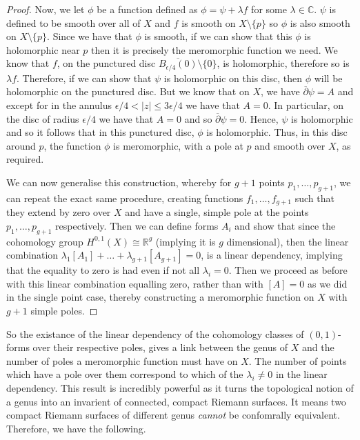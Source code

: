 \documentclass[11pt]{report}
\theoremstyle{definition}
\begin{document}
\begin{proof}
  Now, we let $\phi$ be a function defined as $\phi = \psi + \lambda f$ for some $\lambda \in \mathbb{C}$. $\psi$ is defined to be smooth over all of $X$ and $f$ is smooth on $X\setminus \{p\}$ so $\phi$ is also smooth on $X \setminus \{p\}$. Since we have that $\phi$ is smooth, if we can show that this $\phi$ is holomorphic near $p$ then it is precisely the meromorphic function we need. We know that $f$, on the punctured disc $\overline{B_{\epsilon/4}(0)} \setminus \{0\}$, is holomorphic, therefore so is $\lambda f$. Therefore, if we can show that $\psi$ is holomorphic on this disc, then $\phi$ will be holomorphic on the punctured disc. But we know that on $X$, we have $\overline{\partial}\psi = A$ and except for in the annulus $\epsilon / 4 < |z| \leq 3\epsilon / 4$ we have that $A=0$. In particular, on the disc of radius $\epsilon / 4$ we have that $A=0$ and so $\overline{\partial}\psi = 0$. Hence, $\psi$ is holomorphic and so it follows that in this punctured disc, $\phi$ is holomorphic. Thus, in this disc around $p$, the function $\phi$ is meromorphic, with a pole at $p$ and smooth over $X$, as required.

  We can now generalise this construction, whereby for $g+1$ points $p_1,\ldots, p_{g+1}$, we can repeat the exact same procedure, creating functions $f_1,\ldots,f_{g+1}$ such that they extend by zero over $X$ and have a single, simple pole at the points $p_1,\ldots,p_{g+1}$ respectively. Then we can define forms $A_i$ and show that since the cohomology group $H^{0,1}(X) \cong \mathbb{R}^g$ (implying it is $g$ dimensional), then the linear combination $\lambda_1[A_1]+\ldots+\lambda_{g+1}[A_{g+1}] = 0$, is a linear dependency, implying that the equality to zero is had even if not all $\lambda_i = 0$. Then we proceed as before with this linear combination equalling zero, rather than with $[A]=0$ as we did in the single point case, thereby constructing a meromorphic function on $X$ with $g+1$ simple poles. 
\end{proof}
So the existance of the linear dependency of the cohomology classes of $(0,1)$-forms over their respective poles, gives a link between the genus of $X$ and the number of poles a meromorphic function must have on $X$. The number of points which have a pole over them correspond to which of the $\lambda_i \neq 0$ in the linear dependency. This result is incredibly powerful as it turns the topological notion of a genus into an invarient of connected, compact Riemann surfaces. It means two compact Riemann surfaces of different genus \emph{cannot} be confomrally equivalent. Therefore, we have the following.
\end{document}
